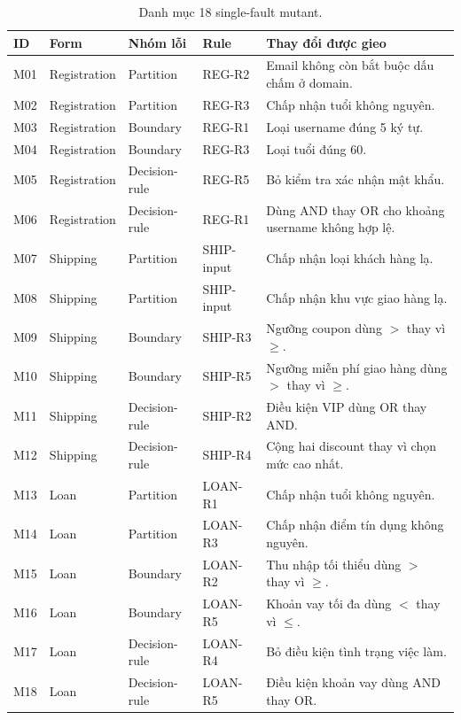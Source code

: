 \documentclass[runningheads]{llncs}
\begin{document}
\begin{table}[htbp]
\caption{Danh mục 18 single-fault mutant.}
\label{tab:mutants}
\centering
\scriptsize
\begin{tabular}{lp{1.45cm}p{1.65cm}lp{5.25cm}}
\toprule
\textbf{ID} & \textbf{Form} & \textbf{Nhóm lỗi} & \textbf{Rule} & \textbf{Thay đổi được gieo} \\
\midrule
M01 & Registration & Partition & REG-R2 & Email không còn bắt buộc dấu chấm ở domain. \\
M02 & Registration & Partition & REG-R3 & Chấp nhận tuổi không nguyên. \\
M03 & Registration & Boundary & REG-R1 & Loại username đúng 5 ký tự. \\
M04 & Registration & Boundary & REG-R3 & Loại tuổi đúng 60. \\
M05 & Registration & Decision-rule & REG-R5 & Bỏ kiểm tra xác nhận mật khẩu. \\
M06 & Registration & Decision-rule & REG-R1 & Dùng AND thay OR cho khoảng username không hợp lệ. \\
M07 & Shipping & Partition & SHIP-input & Chấp nhận loại khách hàng lạ. \\
M08 & Shipping & Partition & SHIP-input & Chấp nhận khu vực giao hàng lạ. \\
M09 & Shipping & Boundary & SHIP-R3 & Ngưỡng coupon dùng $>$ thay vì $\geq$. \\
M10 & Shipping & Boundary & SHIP-R5 & Ngưỡng miễn phí giao hàng dùng $>$ thay vì $\geq$. \\
M11 & Shipping & Decision-rule & SHIP-R2 & Điều kiện VIP dùng OR thay AND. \\
M12 & Shipping & Decision-rule & SHIP-R4 & Cộng hai discount thay vì chọn mức cao nhất. \\
M13 & Loan & Partition & LOAN-R1 & Chấp nhận tuổi không nguyên. \\
M14 & Loan & Partition & LOAN-R3 & Chấp nhận điểm tín dụng không nguyên. \\
M15 & Loan & Boundary & LOAN-R2 & Thu nhập tối thiểu dùng $>$ thay vì $\geq$. \\
M16 & Loan & Boundary & LOAN-R5 & Khoản vay tối đa dùng $<$ thay vì $\leq$. \\
M17 & Loan & Decision-rule & LOAN-R4 & Bỏ điều kiện tình trạng việc làm. \\
M18 & Loan & Decision-rule & LOAN-R5 & Điều kiện khoản vay dùng AND thay OR. \\
\bottomrule
\end{tabular}
\end{table}
\FloatBarrier
\end{document}
